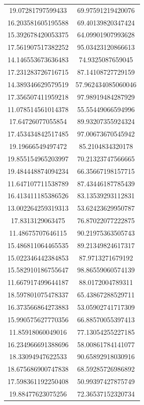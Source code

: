\begin{table}
\begin{tabular}{cc}
19.07281797599433 & 69.97591219420076 \\
16.203581605195588 & 69.40139820347424 \\
15.392678420053375 & 64.09901907993628 \\
17.561907517382252 & 95.03423120866613 \\
14.146553673636483 & 74.9325087659045 \\
17.231283726716715 & 87.14108727729159 \\
14.389346629579519 & 57.962434085060046 \\
17.356507411959218 & 97.98919484287929 \\
11.078514561014378 & 55.55449066594996 \\
17.64726077055854 & 89.93207355924324 \\
17.453434842517485 & 97.00673670545942 \\
19.19666549497472 & 85.2104834320178 \\
19.855154965203997 & 70.21323747566665 \\
19.484448874094234 & 66.35667198157715 \\
11.647107711538789 & 87.43446187785439 \\
16.413411185386526 & 83.13539293112831 \\
13.002264259319313 & 53.62423629950787 \\
17.8313129063475 & 76.87022077222875 \\
11.48675707646115 & 90.21975363505743 \\
15.486811064465535 & 89.21349824617317 \\
15.022346442384853 & 87.9713271679192 \\
15.582910186755647 & 98.86559060574139 \\
11.667917499644187 & 88.0172004789311 \\
18.597801075478337 & 65.43867288529711 \\
16.373566864273883 & 53.05902741717309 \\
15.990575627770356 & 66.88570055397413 \\
11.85918060049016 & 77.13054255227185 \\
16.234966691388696 & 58.00861784141077 \\
18.33094947622533 & 90.65892918030916 \\
18.675686900747838 & 68.59285726986892 \\
17.598361192250408 & 50.99397427875749 \\
19.88477623075256 & 72.36537152320734 \\

\end{tabular}
\end{table}
